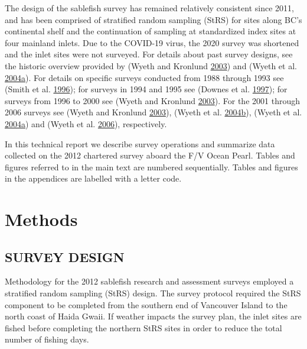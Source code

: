 \documentclass[12pt]{article}\usepackage[]{graphicx}\usepackage[]{color}
\begin{document}
The design of the sablefish survey has remained relatively consistent since 2011, and has been comprised of stratified random sampling (StRS) for sites along BC's continental shelf and the continuation of sampling at standardized index sites at four mainland inlets. Due to the COVID-19 virus, the 2020 survey was shortened and the inlet sites were not surveyed. For details about past survey designs, see the historic overview provided by (Wyeth and Kronlund \protect\hyperlink{ref-Wyeth2003}{2003}) and (Wyeth et al. \protect\hyperlink{ref-Wyeth2004b}{2004}\protect\hyperlink{ref-Wyeth2004b}{a}). For details on specific surveys conducted from 1988 through 1993 see (Smith et al. \protect\hyperlink{ref-Smith1996}{1996}); for surveys in 1994 and 1995 see (Downes et al. \protect\hyperlink{ref-Downes1997}{1997}); for surveys from 1996 to 2000 see (Wyeth and Kronlund \protect\hyperlink{ref-Wyeth2003}{2003}). For the 2001 through 2006 surveys see (Wyeth and Kronlund \protect\hyperlink{ref-Wyeth2003}{2003}), (Wyeth et al. \protect\hyperlink{ref-Wyeth2004a}{2004}\protect\hyperlink{ref-Wyeth2004a}{b}), (Wyeth et al. \protect\hyperlink{ref-Wyeth2004b}{2004}\protect\hyperlink{ref-Wyeth2004b}{a}) and (Wyeth et al. \protect\hyperlink{ref-Wyeth2006}{2006}), respectively.

In this technical report we describe survey operations and summarize data collected on the 2012 chartered survey aboard the F/V Ocean Pearl. Tables and figures referred to in the main text are numbered sequentially. Tables and figures in the appendices are labelled with a letter code.

\hypertarget{methods}{%
\section{Methods}\label{methods}}

\hypertarget{survey-design}{%
\subsection{SURVEY DESIGN}\label{survey-design}}

Methodology for the 2012 sablefish research and assessment surveys employed a stratified random sampling (StRS) design. The survey protocol required the StRS component to be completed from the southern end of Vancouver Island to the north coast of Haida Gwaii. If weather impacts the survey plan, the inlet sites are fished before completing the northern StRS sites in order to reduce the total number of fishing days.
\end{document}

